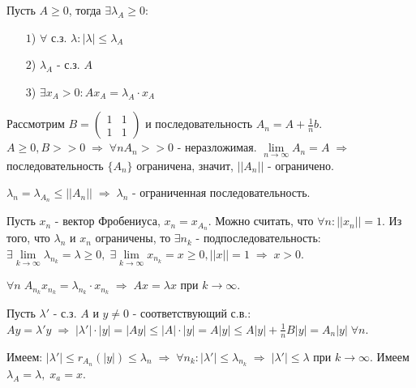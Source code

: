 \begin{theorem}[]\label{cha:7/the:2}
	Пусть $A \ge 0$, тогда $\exists \lambda_A \ge 0$:
	\begin{itemize}
		\item[$1$)]
			$\forall$ с.з. $\lambda: |\lambda| \le \lambda_A$
		\item[$2$)]
			$\lambda_A$ - с.з. $A$
		\item[$3$)]
			$\exists x_A > 0: A x_A = \lambda_A \cdot x_A$
	\end{itemize}
\end{theorem}
\begin{Proof}
	Рассмотрим $B = \begin{pmatrix}
		1 & 1 \\ 1 & 1
	\end{pmatrix}$ и последовательность $A_n = A + \frac{1}{n} b$. $A \ge 0, B >>0 \; \Rightarrow \; \forall n A_n >> 0$ - неразложимая. $\underset{n \to \infty}{\lim} A_n = A \; \Rightarrow$ последовательность $\{A_n\}$ ограничена, значит, $||A_n||$ - ограничено.

	$\lambda_n = \lambda_{A_n} \le ||A_n|| \; \Rightarrow \; \lambda_n$ - ограниченная последовательность.

	Пусть $x_n$ - вектор Фробениуса, $x_n = x_{A_n}$. Можно считать, что $\forall n: ||x_n|| = 1$. Из того, что $\lambda_n$ и $x_n$ ограничены, то $\exists n_k$ - подпоследовательность: $\exists \underset{k \to \infty}{\lim} \lambda_{n_k} = \lambda \ge 0, \; \exists \underset{k \to \infty}{\lim} x_{n_k} = x \ge 0, ||x||=1 \; \Rightarrow \; x > 0$.

	$\forall n \; A_{n_k} x_{n_k} = \lambda_{n_k} \cdot x_{n_k} \; \Rightarrow \; Ax = \lambda x$ при $k \to \infty$.

	Пусть $\lambda'$ - с.з. $A$ и $y \not = 0$ - соответствующий с.в.: $Ay = \lambda' y \; \Rightarrow \; |\lambda'|\cdot |y| = |A y| \le |A| \cdot |y| = A |y| \le A |y| + \frac{1}{n} B |y| = A_n |y| \; \forall n$.

	Имеем: $|\lambda'| \le r_{A_n} (|y|) \le \lambda_n \; \Rightarrow \; \forall n_k: |\lambda'| \le \lambda_{n_k} \; \Rightarrow \; |\lambda'| \le \lambda$ при $k \to \infty$. Имеем $\lambda_A = \lambda, \; x_a = x$.
\end{Proof}


















